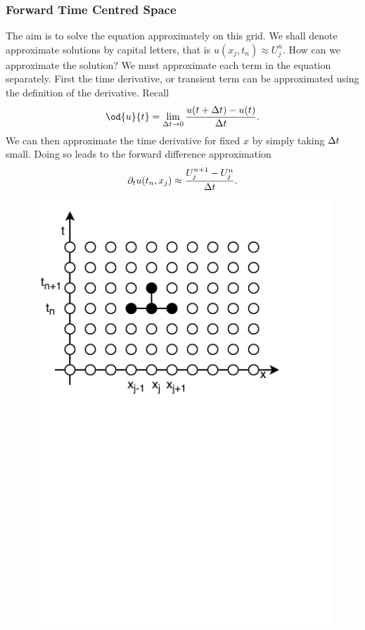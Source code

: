     \subsubsection*{Forward Time Centred Space}
    The aim is to solve the equation approximately on this grid. We shall denote approximate solutions by capital letters, that is \(u(x_j,t_n) \approx U_j^n\). How can we approximate the solution? We must approximate each term in the equation separately. First the time derivative, or transient term can be approximated using the definition of the derivative. Recall
    \[
    \od{u}{t} = \lim_{\Delta t \to 0}\frac{u(t+\Dt) - u(t)}{\Dt}.
    \]
    We can then approximate the time derivative for fixed $x$ by simply taking \(\Delta t\) small. Doing so leads to the forward difference approximation
    \[
    \partial_t u(t_n,x_j) \approx \frac{U^{n+1}_j- U^n_j}{\Delta t}.
    \]
    \begin{figure}
        \centering
        \includegraphics[width=0.7\linewidth, trim={0 5cm 0 0}, clip]{Figures/FTCS}
        \caption{}
        \label{fig:FTCSmesh}
    \end{figure}

